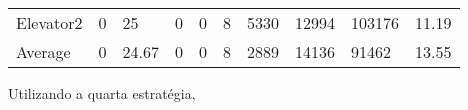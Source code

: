 \documentclass[a4paper]{article}
\begin{document}
\begin{table}[h]
\begin{tabular}{@{}llllllllll@{}}
Elevator2 & 0        & 25            & 0           & 0                                                               & 8                                                                  & 5330                                                         & 12994                                                 & 103176                                                   & 11.19         \\
Average   & 0     & 24.67         & 0        & 0                                                               & 8                                                              & 2889                                                         & 14136                                                 &  91462                                                  & 13.55         \\ \bottomrule
\end{tabular}
\end{table}

\newpage

Utilizando a quarta estratégia,
\end{document}
